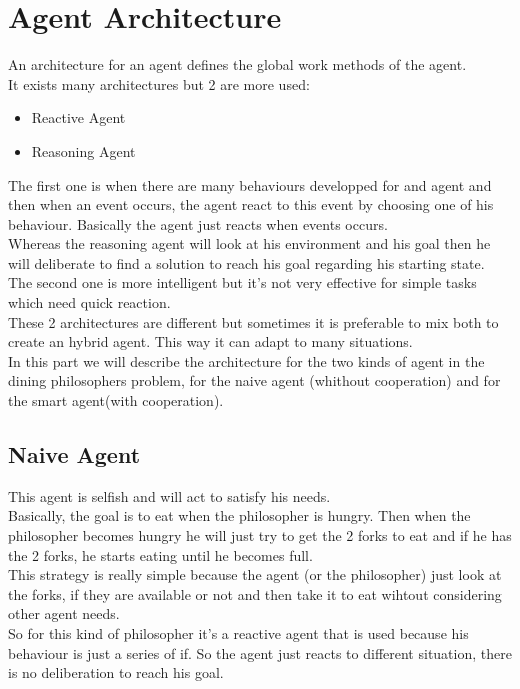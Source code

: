 \section{Agent Architecture}

An architecture for an agent defines the global work methods of the agent.\\
It exists many architectures but 2 are more used:\\
\begin{itemize}
	\item Reactive Agent
	\item Reasoning Agent
\end{itemize}
The first one is when there are many behaviours developped for and agent and then when an event occurs, the agent react to this event by choosing one of his behaviour. Basically the agent just reacts when events occurs.\\
Whereas the reasoning agent will look at his environment and his goal then he will deliberate to find a solution to reach his goal regarding his starting state.\\
The second one is more intelligent but it's not very effective for simple tasks which need quick reaction.\\
These 2 architectures are different but sometimes it is preferable to mix both to create an hybrid agent. This way it can adapt to many situations.\\
In this part we will describe the architecture for the two kinds of agent in the dining philosophers problem, for the naive agent (whithout cooperation) and for the smart agent(with cooperation).

\subsection{Naive Agent}
This agent is selfish and will act to satisfy his needs.\\
Basically, the goal is to eat when the philosopher is hungry. Then when the philosopher becomes hungry he will just try to get the 2 forks to eat and if he has the 2 forks, he starts eating until he becomes full.\\
This strategy is really simple because the agent (or the philosopher) just look at the forks, if they are available or not and then take it to eat wihtout considering other agent needs.\\
So for this kind of philosopher it's a reactive agent that is used because his behaviour is just a series of if. So the agent just reacts to different situation, there is no deliberation to reach his goal.

